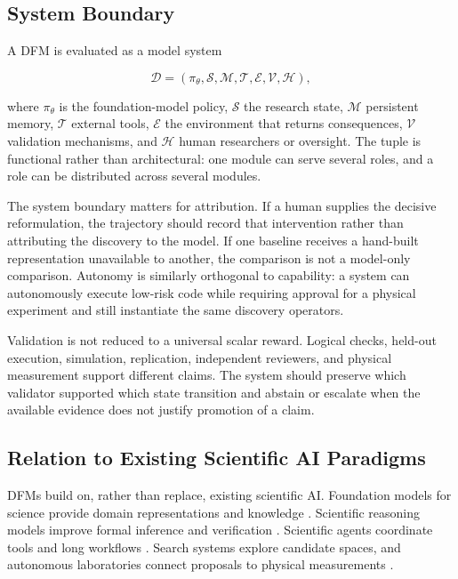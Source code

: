 \documentclass[11pt, a4paper, copyright]{google}
\begin{document}
\subsection{System Boundary}
\label{subsec:model-systems}

A DFM is evaluated as a model system

\begin{equation}
\mathcal{D}=(\pi_{\theta},\mathcal{S},\mathcal{M},\mathcal{T},\mathcal{E},\mathcal{V},\mathcal{H}),
\label{eq:dfm-system}
\end{equation}

where $\pi_\theta$ is the foundation-model policy, $\mathcal{S}$ the research state, $\mathcal{M}$ persistent memory, $\mathcal{T}$ external tools, $\mathcal{E}$ the environment that returns consequences, $\mathcal{V}$ validation mechanisms, and $\mathcal{H}$ human researchers or oversight. The tuple is functional rather than architectural: one module can serve several roles, and a role can be distributed across several modules.

The system boundary matters for attribution. If a human supplies the decisive reformulation, the trajectory should record that intervention rather than attributing the discovery to the model. If one baseline receives a hand-built representation unavailable to another, the comparison is not a model-only comparison. Autonomy is similarly orthogonal to capability: a system can autonomously execute low-risk code while requiring approval for a physical experiment and still instantiate the same discovery operators.

Validation is not reduced to a universal scalar reward. Logical checks, held-out execution, simulation, replication, independent reviewers, and physical measurement support different claims. The system should preserve which validator supported which state transition and abstain or escalate when the available evidence does not justify promotion of a claim.

\subsection{Relation to Existing Scientific AI Paradigms}
\label{subsec:existing-paradigms}

DFMs build on, rather than replace, existing scientific AI. Foundation models for science provide domain representations and knowledge \citep{jumper2021alphafold,abramson2024alphafold3,merchant2023gnome,zeni2025mattergen}. Scientific reasoning models improve formal inference and verification \citep{wei2022cot,lightman2024verify,snell2025testtime,guo2025deepseek}. Scientific agents coordinate tools and long workflows \citep{baek2025researchagent,skarlinski2024paperqa2,gottweis2026coscientist,lu2026aiscientist,ghareeb2026robin}. Search systems explore candidate spaces, and autonomous laboratories connect proposals to physical measurements \citep{abolhasani2023selfdriving,boiko2023coscientist,szymanski2023alab,swanson2025virtuallab}.
\end{document}
